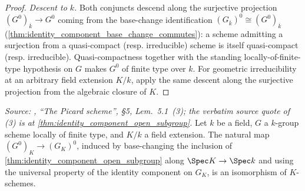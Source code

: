 \begin{proof}
  \emph{Descent to \(k\).}  Both conjuncts descend along the surjective
  projection \((G^0)_{\overline k} \to G^0\) coming from the base-change
  identification \((G_{\overline k})^0 \cong (G^0)_{\overline k}\)
  (\cref{thm:identity_component_base_change_commutes}): a scheme admitting a
  surjection from a quasi-compact (resp. irreducible) scheme is itself
  quasi-compact (resp. irreducible). Quasi-compactness together with the
  standing locally-of-finite-type hypothesis on \(G\) makes \(G^0\) of
  finite type over \(k\). For geometric irreducibility at an arbitrary field
  extension \(K/k\), apply the same descent along the surjective projection
  from the algebraic closure of \(K\).
\end{proof}

\begin{theorem}\leanok
  \label{thm:identity_component_base_change_commutes}

  \textit{Source: \cite{kleiman-picard}, ``The Picard scheme'', \S 5,
  Lem.~5.1~(3); the verbatim source quote of (3) is at
  \cref{thm:identity_component_open_subgroup}.}
  Let \(k\) be a field, \(G\) a \(k\)-group scheme locally of finite
  type, and \(K/k\) a field extension. The natural map
  \((G^0)_K \to (G_K)^0\), induced by base-changing the inclusion of
  \cref{thm:identity_component_open_subgroup} along \(\Spec K \to \Spec k\)
  and using the universal property of the identity component on
  \(G_K\), is an isomorphism of \(K\)-schemes.
\end{theorem}


